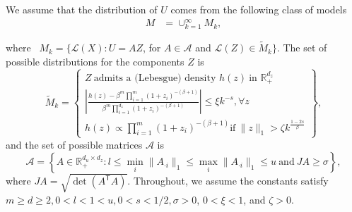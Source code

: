 \documentclass[10pt,a4paper]{amsart}
\newcommand{\nobracket}{}
\begin{document}
\begin{assumption}
  \label{assump:mvary}We assume that the distribution of $U$ comes from the
  following class of models
  \begin{align*}
    M & = \cup_{k = 1}^{\infty} M_k,
  \end{align*}
  
  where \ $M_k =\{\mathcal{L}(X) : U = AZ$, for $A \in \mathcal{A}$ and
  $\nobracket \mathcal{L}(Z) \in \tilde{M}_k \}$. The set of possible
  distributions for the components $Z$ is
  \[ \tilde{M}_k = \left\{ \begin{array}{c}
       Z \ \text{admits a (Lebesgue) density } h (z)  \  \text{in } \mathbb{R}_+^{d_z} \\
       \left| \frac{h (z) - \beta^m  \prod_{i = 1}^m (1 +
       z_i)^{- (\beta + 1)}}{\beta^m  \prod_{i = 1}^{d_z} (1 + z_i)^{- (\beta +
       1)}} \right| \leqslant \xi k^{- s}, \forall z\\
       h (z) \varpropto \prod_{i = 1}^m (1 + z_i)^{- (\beta + 1)}  \text{if} \ \|z\|_1 > \zeta k^{\frac{1 - 2 s}{\beta}}
     \end{array} \right\}, \]
  and the set of possible matrices $\mathcal{A}$ is
  \[ \mathcal{A}= \left\{ A \in \mathbb{R}_+^{d_u \times d_z} : l \leq \min_i
     \|A_{\cdot i} \|_1 \leq \max_i \|A_{\cdot i} \|_1 \leq u \ \text{and} \  JA
     \geq \sigma \right\} ,\]
  where ${J}A = \sqrt{\det(A^\mathsf{T}A)}$. Throughout, we assume the constants satisfy $m \geq d \geq 2, 0 < l < 1 < u,
  0 < s < 1 / 2, \sigma > 0$, $0 < \xi < 1$, and $\zeta > 0$.
\end{assumption}
\end{document}

